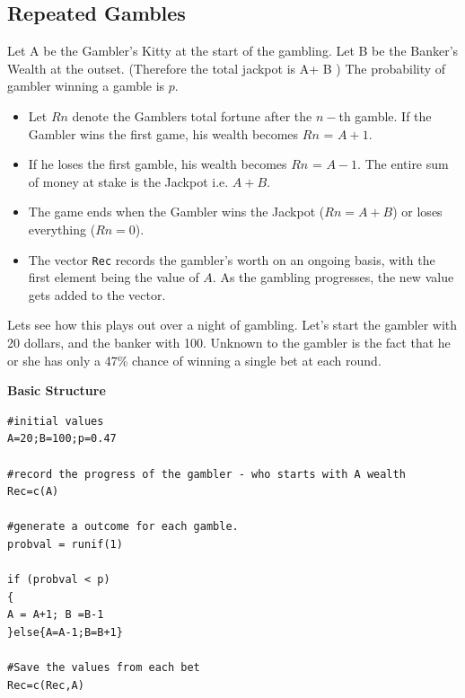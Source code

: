 \documentclass[11pt]{article} %
\begin{document}
\subsection{Repeated Gambles}
Let A be the Gambler's Kitty at the start of the gambling. Let B be the Banker's Wealth at the outset. (Therefore the total jackpot is A+ B )
The probability of gambler winning a gamble is $p$.

\begin{itemize}
\item Let $Rn$ denote the Gamblers total fortune after the $n-$th gamble. If the Gambler wins the first game, his wealth becomes $Rn$ = $A + 1$. 
\item If he loses the first gamble, his wealth becomes $Rn$ = $A - 1$. The entire sum of money at stake is the Jackpot i.e. $A + B$. 
\item The game ends when the Gambler wins the Jackpot ($Rn = A + B$) or loses everything ($Rn = 0$).
\item The vector \texttt{Rec} records the gambler's worth on an ongoing basis, with the first element being the value of $A$. As the gambling progresses, the new value gets added to the vector.
\end{itemize}

Lets see how this plays out over a night of gambling. Let's start the gambler with 20 dollars, and the banker with 100. Unknown to the gambler is the fact that he or she has only a 47\% chance of winning a single bet at each round.
\begin{framed}
\textbf{Basic Structure}
\begin{verbatim}
#initial values
A=20;B=100;p=0.47

#record the progress of the gambler - who starts with A wealth
Rec=c(A)

#generate a outcome for each gamble.
probval = runif(1)

if (probval < p)
{
A = A+1; B =B-1
}else{A=A-1;B=B+1}

#Save the values from each bet
Rec=c(Rec,A)
\end{verbatim}
\end{framed}
\newpage
\end{document}
